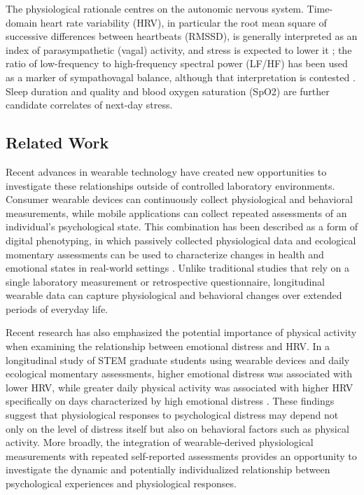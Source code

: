 \documentclass[11pt, a4paper, oneside]{article}
\begin{document}
The physiological rationale centres on the autonomic nervous system. Time-domain heart rate variability (HRV), in particular the root mean square of successive differences between heartbeats (RMSSD), is generally interpreted as an index of parasympathetic (vagal) activity, and stress is expected to lower it \cite{reference 2}; the ratio of low-frequency to high-frequency spectral power (LF/HF) has been used as a marker of sympathovagal balance, although that interpretation is contested \cite{reference 3, reference 4}. Sleep duration and quality and blood oxygen saturation (SpO2) are further candidate correlates of next-day stress.

\subsection{Related Work}
Recent advances in wearable technology have created new opportunities to investigate these relationships outside of controlled laboratory environments. Consumer wearable devices can continuously collect physiological and behavioral measurements, while mobile applications can collect repeated assessments of an individual's psychological state. This combination has been described as a form of digital phenotyping, in which passively collected physiological data and ecological momentary assessments can be used to characterize changes in health and emotional states in real-world settings \cite{reference 5}. Unlike traditional studies that rely on a single laboratory measurement or retrospective questionnaire, longitudinal wearable data can capture physiological and behavioral changes over extended periods of everyday life.

Recent research has also emphasized the potential importance of physical activity when examining the relationship between emotional distress and HRV. In a longitudinal study of STEM graduate students using wearable devices and daily ecological momentary assessments, higher emotional distress was associated with lower HRV, while greater daily physical activity was associated with higher HRV specifically on days characterized by high emotional distress \cite{reference 5}. These findings suggest that physiological responses to psychological distress may depend not only on the level of distress itself but also on behavioral factors such as physical activity. More broadly, the integration of wearable-derived physiological measurements with repeated self-reported assessments provides an opportunity to investigate the dynamic and potentially individualized relationship between psychological experiences and physiological responses.
\end{document}
